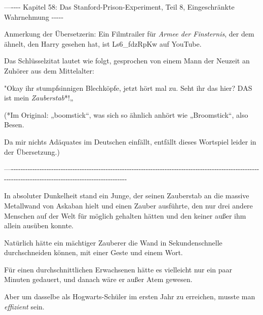 

\hypertarget{das-stanford-prison-experiment-teil-8-eingeschruxe4nkte-wahrnehmung}{%

—\/-\/-\/-\/- Kapitel 58: Das Stanford-Prison-Experiment, Teil 8, Eingeschränkte Wahrnehmung -\/-\/-\/-\/-

Anmerkung der Übersetzerin: Ein Filmtrailer für \emph{Armee der Finsternis}, der dem ähnelt, den Harry gesehen hat, ist Ls6\_fdzRpKw auf YouTube.

Das Schlüsselzitat lautet wie folgt, gesprochen von einem Mann der Neuzeit an Zuhörer aus dem Mittelalter:

"Okay ihr stumpfsinnigen Blechköpfe, jetzt hört mal zu. Seht ihr das hier? DAS ist mein \emph{Zauberstab}*!„

(*Im Original: „boomstick“, was sich so ähnlich anhört wie „Broomstick“, also Besen.

Da mir nichts Adäquates im Deutschen einfällt, entfällt dieses Wortspiel leider in der Übersetzung.)

—\/-\/-\/-\/-\/-\/-\/-\/-\/-\/-\/-\/-\/-\/-\/-\/-\/-\/-\/-\/-\/-\/-\/-\/-\/-\/-\/-\/-\/-\/-\/-\/-\/-\/-\/-\/-\/-\/-\/-\/-\/-\/-\/-\/-\/-\/-\/-\/-\/-\/-\/-\/-\/-\/-\/-\/-\/-\/-\/-\/-\/-\/-\/-\/-\/-\/-\/-\/-\/-\/-\/-\/-\/-\/-\/-\/-\/-\/-\/-\/-\/-\/-\/-\/-\/-\/-\/-\/-\/-\/-\/-\/-\/-\/-\/-\/-\/-\/-\/-\/-\/-\/-\/-\/-\/-\/-\/-\/-\/-\/-\/-\/-\/-\/-\/-\/-\/-\/-\/-\/-\/-\/-\/-\/-\/-\/-\/-\/-\/-\/-\/-\/-\/-\/-\/-\/-\/-\/-\/-\/-\/-\/-\/-\/-\/-\/-\/-\/-\/-\/-\/-\/-\/-\/-\/-\/-\/-

In absoluter Dunkelheit stand ein Junge, der seinen Zauberstab an die massive Metallwand von Askaban hielt und einen Zauber ausführte, den nur drei andere Menschen auf der Welt für möglich gehalten hätten und den keiner außer ihm allein ausüben konnte.

Natürlich hätte ein mächtiger Zauberer die Wand in Sekundenschnelle durchschneiden können, mit einer Geste und einem Wort.

Für einen durchschnittlichen Erwachsenen hätte es vielleicht nur ein paar Minuten gedauert, und danach wäre er außer Atem gewesen.

Aber um dasselbe als Hogwarts-Schüler im ersten Jahr zu erreichen, musste man \emph{effizient} sein.

}
